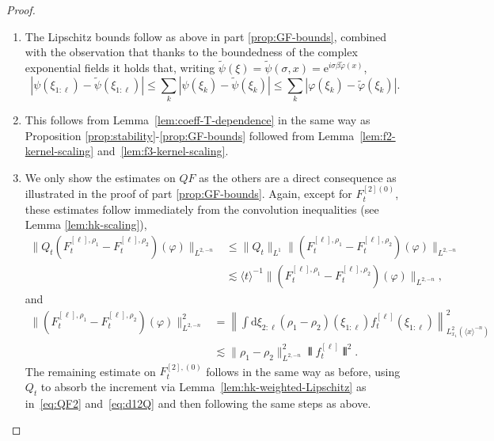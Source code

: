 \documentclass[11pt, a4paper]{scrartcl}
\numberwithin{equation}{section}
\theoremstyle{plain}
\theoremstyle{remark}
\newcommand{\mathD}{\mathrm{D}}
\newcommand{\mathd}{\mathrm{d}}
\newcommand{\mathe}{\mathrm{e}}
\newenvironment{enumeratealpha}{\begin{enumerate}[a{\textup{)}}] }{\end{enumerate}}
\begin{document}
\begin{proof}
\begin{enumeratealpha}
		Finally, the estimates on $H$ follow from the estimates above and
		\[ \begin{aligned}
				\| H_t (\varphi) \|_{L^{\infty}} & \leqslant  \frac{1}{2}
				\sum_{\ell' + \ell'' > 3} \| \mathD (F^{[\ell]}_t  \dot{G}_t
				F^{[\ell'']}_t) (\varphi) \|_{L^{\infty}}                                                          \\
				                                 & \lesssim  \sum_{\ell' + \ell'' > 3} \| \mathD F_t^{[\ell']} Q_t
				(Q_t F^{[\ell'']}_t) \|_{L^{\infty}} \lesssim \sum_{\ell' + \ell'' >
					3} (\bar{\lambda}_t \langle t \rangle^{- 1})^{\ell' + \ell''} .
			\end{aligned} \]
		\item The Lipschitz bounds follow as above in part \ref{prop:GF-bounds},
		combined with the observation that thanks to the boundedness of the
		complex exponential fields it holds that, writing $\tilde{\psi} (\xi) =
			\tilde{\psi} (\sigma, x) = \mathe^{i \sigma \beta \tilde{\varphi} (x)}$,
		\[ | \psi (\xi_{1 : \ell}) - \tilde{\psi} (\xi_{1 : \ell}) | \leqslant
			\sum_k | \psi (\xi_k) - \tilde{\psi} (\xi_k) | \leqslant \sum_k |
			\varphi (\xi_k) - \tilde{\varphi} (\xi_k) |. \]
		\item This follows from Lemma~\ref{lem:coeff-T-dependence} in the same way
		as Proposition \ref{prop:stability}-\ref{prop:GF-bounds} followed from
		Lemma~\ref{lem:f2-kernel-scaling} and~\ref{lem:f3-kernel-scaling}.

		\item We only show the estimates on $Q F$ as the others are a direct
		consequence as illustrated in the proof of part \ref{prop:GF-bounds}.
		Again, except for $F^{[2] (0)}_t$, these estimates follow immediately from
		the convolution inequalities (see Lemma \ref{lem:hk-scaling}),
		\[ \begin{aligned}
				\| Q_t (F_t^{[\ell], \rho_1} - F^{[\ell], \rho_2}_t) (\varphi)
				\|_{L^{2, - n}} & \leqslant  \| Q_t \|_{L^1} \| (F_t^{[\ell],
				\rho_1} - F^{[\ell], \rho_2}_t) (\varphi) \|_{L^{2, - n}}                      \\
				                & \lesssim  \langle t \rangle^{- 1} \| (F_t^{[\ell], \rho_1} -
				F^{[\ell], \rho_2}_t) (\varphi) \|_{L^{2, - n}},
			\end{aligned} \]
		and
		\begin{align*}
			\| (F_t^{[\ell], \rho_1} - F^{[\ell], \rho_2}_t) (\varphi) \|_{L^{2,
			- n}}^2 & =  \left\| \int \mathd \xi_{2 : \ell} (\rho_1 - \rho_2)
			(\xi_{1 : \ell}) f^{[\ell]}_t (\xi_{1 : \ell}) \right\|_{L^2_{x_1}
			(\langle x \rangle^{- n})}^2                                        \\
			        & \lesssim \| \rho_1 - \rho_2 \|_{L^{2, - n}}^2 \interleave
			f_t^{[\ell]} \interleave^2 .
		\end{align*}
		The remaining estimate on $F^{[2], (0)}_t$ follows in the same way as
		before, using $Q_t$ to absorb the increment via
		Lemma~\ref{lem:hk-weighted-Lipschitz} as in~\eqref{eq:QF2}
		and~\eqref{eq:d12Q} and then following the same steps as above.
	\end{enumeratealpha}
\end{proof}
\end{document}
